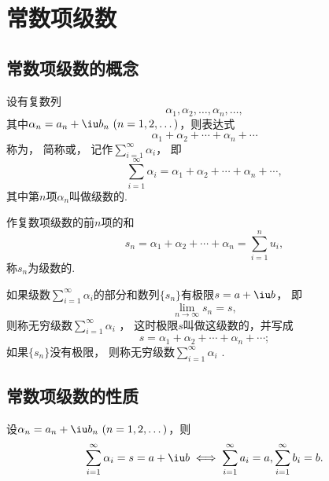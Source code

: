 \section{常数项级数}
\subsection{常数项级数的概念}
\begin{definition}
设有复数列\[
	\alpha_1,\alpha_2,\dotsc,\alpha_n,\dotsc,
\]
其中\(\alpha_n=a_n+\iu b_n\ (n=1,2,\dotsc)\)，则表达式\[
	\alpha_1+\alpha_2+\dotsb+\alpha_n+\dotsb
\]
称为，
简称或，
记作\(\sum_{i=1}^\infty \alpha_i\)，
即\[
	\sum_{i=1}^\infty \alpha_i = \alpha_1+\alpha_2+\dotsb+\alpha_n+\dotsb,
\]
其中第\(n\)项\(\alpha_n\)叫做级数的.

作复数项级数的前\(n\)项的和\[
	s_n = \alpha_1+\alpha_2+\dotsb+\alpha_n = \sum_{i=1}^n{u_i},
\]
称\(s_n\)为级数的.

如果级数\(\sum_{i=1}^\infty \alpha_i\)的部分和数列\(\{s_n\}\)有极限\(s=a+\iu b\)，
即\[
	\lim_{n\to\infty}s_n = s,
\]
则称无穷级数\(\sum_{i=1}^\infty \alpha_i\) ，
这时极限\(s\)叫做这级数的，并写成\[
	s = \alpha_1+\alpha_2+\dotsb+\alpha_n+\dotsb;
\]
如果\(\{s_n\}\)没有极限，
则称无穷级数\(\sum_{i=1}^\infty \alpha_i\) .
\end{definition}

\subsection{常数项级数的性质}
\begin{theorem}\label{theorem:解析函数的级数表示.复级数与其实部及虚部级数的关系}
设\(\alpha_n=a_n+\iu b_n\ (n=1,2,\dots)\)，则\[
	\sum_{i=1}^\infty \alpha_i = s = a + \iu b
	\iff
	\sum_{i=1}^\infty a_i = a,
	\sum_{i=1}^\infty b_i = b.
\]
\end{theorem}

